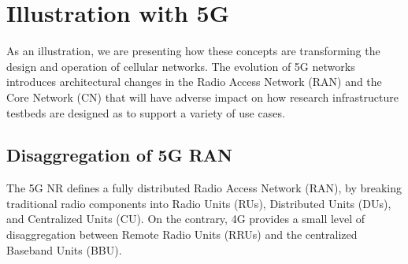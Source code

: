 \section{Illustration with 5G}
\label{section:5G}


As an illustration, we are presenting how these concepts are transforming the design and operation of cellular networks. The evolution of 5G networks introduces architectural changes in the Radio Access Network (RAN) \cite{ghosh20195g} and the Core Network (CN) \cite{rommer20195g} that will have adverse impact on how research infrastructure testbeds are designed as to support a variety of use cases. 

\subsection{Disaggregation of 5G RAN}

The 5G NR \cite{5g-nr-3gpp} defines a fully distributed Radio Access Network (RAN), by breaking traditional radio components into Radio Units (RUs), Distributed Units (DUs), and Centralized Units (CU). On the contrary, 4G provides a small level of disaggregation between Remote Radio Units (RRUs) and the centralized Baseband Units (BBU).

